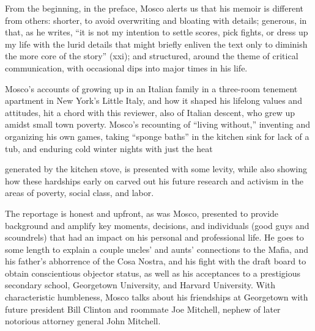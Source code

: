 \documentclass{tufte-handout}
\begin{document}
\begin{titlepage}
From the beginning, in the preface, Mosco alerts us that his memoir is
different from others: shorter, to avoid overwriting and bloating with
details; generous, in that, as he writes, ``it is not my intention to
settle scores, pick fights, or dress up my life with the lurid details
that might briefly enliven the text only to diminish the more core of
the story'' (xxi); and structured, around the theme of critical
communication, with occasional dips into major times in his life.


Mosco's accounts of growing up in an Italian family in a three-room
tenement apartment in New York's Little Italy, and how it shaped his
lifelong values and attitudes, hit a chord with this reviewer, also of
Italian descent, who grew up amidst small town poverty. Mosco's
recounting of ``living without,'' inventing and organizing his own
games, taking ``sponge baths'' in the kitchen sink for lack of a tub,
and enduring cold winter nights with just the heat 



\enlargethispage{2\baselineskip}

\vspace*{2em}



\end{titlepage}


\noindent generated by the
kitchen stove, is presented with some levity, while also showing how
these hardships early on carved out his future research and activism in
the areas of poverty, social class, and labor.

The reportage is honest and upfront, as was Mosco, presented to provide
background and amplify key moments, decisions, and individuals (good
guys and scoundrels) that had an impact on his personal and professional
life. He goes to some length to explain a couple uncles' and aunts'
connections to the Mafia, and his father's abhorrence of the Cosa
Nostra, and his fight with the draft board to obtain conscientious
objector status, as well as his acceptances to a prestigious secondary
school, Georgetown University, and Harvard University. With
characteristic humbleness, Mosco talks about his friendships at
Georgetown with future president Bill Clinton and roommate Joe Mitchell,
nephew of later notorious attorney general John Mitchell.
\end{document}
